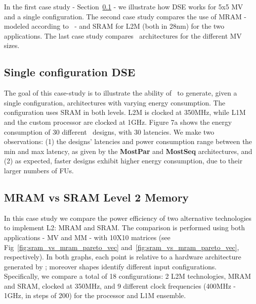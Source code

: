 In the first case study - Section~\ref{ssec:exp_single} - we illustrate how DSE works for 5x5 MV and a single configuration. The second case study compares the use of MRAM - modeled according to~\cite{8310393} - and SRAM for L2M (both in 28nm) for the two applications. The last case study compares \frameworkname~architectures for the different MV sizes.

\vspace{-1mm}
\subsection{Single configuration DSE}
\label{ssec:exp_single}
\vspace{-1mm}
The goal of this case-study is to illustrate the ability of \frameworkname~to generate, given a single configuration, architectures with varying energy consumption. The configuration uses SRAM in both levels. L2M is clocked at 350MHz, while L1M and the custom processor are clocked at 1GHz. Figure 7a shows the energy consumption of 30 different \frameworkname~designs, with 30 latencies. We make two observations: (1) the designs' latencies and power consumption range between the min and max latency, as given by the \textbf{MostPar} and \textbf{MostSeq} architectures, and (2) as expected, faster designs exhibit higher energy consumption, due to their larger numbers of FUs.


\vspace{-1mm}
\subsection{MRAM vs SRAM Level 2 Memory}
\label{ssec:case_study2}
\vspace{-1mm}

In this case study we compare the power efficiency of two alternative technologies to implement L2: MRAM and SRAM.
The comparison is performed using both applications - MV and MM - with 10X10 matrices (see Fig~\ref{fig:sram_vs_mram_pareto_vec} and~\ref{fig:sram_vs_mram_pareto_vec}, respectively). In both graphs, each point is relative to a hardware architecture generated by \frameworkname; moreover shapes identify different input configurations. Specifically, we compare a total of 18 configurations: 2 L2M technologies, MRAM and SRAM, clocked at 350MHz, and 9 different clock frequencies (400MHz - 1GHz, in steps of 200) for the processor and L1M ensemble.

